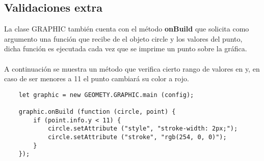 \documentclass[10pt]{article}
\begin{document}
\subsection{Validaciones extra}

La clase GRAPHIC también cuenta con el método \textbf{onBuild} que solicita como argumento una función que recibe de el objeto circle y los valores del punto, dicha función es ejecutada cada vez que se imprime un punto sobre la gráfica.
\\\\
A continuación se muestra un método que verifica cierto rango de valores en y, en caso de ser menores a 11 el punto cambiará su color a rojo.
\\
\begin{lstlisting}
	let graphic = new GEOMETY.GRAPHIC.main (config);
	
	graphic.onBuild (function (circle, point) {
		if (point.info.y < 11) {
            circle.setAttribute ("style", "stroke-width: 2px;");
            circle.setAttribute ("stroke", "rgb(254, 0, 0)");
        }
	});
\end{lstlisting}
\end{document}
